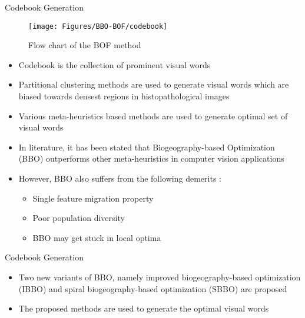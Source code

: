 \documentclass [9pt,times] {beamer}
\begin{document}
\begin{frame}{Codebook Generation}

\begin{figure}[t]
			\centering
			\texttt{[image: Figures/BBO-BOF/codebook]}
			\caption{{\scriptsize Flow chart of the BOF method}}\label{fig:emp}
		\end{figure}
\begin{itemize}
\justifying
\fontsize{7pt}{10pt}\selectfont
\item Codebook is the collection of prominent visual words
\item Partitional clustering methods are used to generate visual words which are biased towards densest regions in histopathological images
\item Various meta-heuristics based methods are used to generate optimal set of visual words
\item In literature, it has been stated that Biogeography-based Optimization (BBO) outperforms other meta-heuristics in computer vision applications \cite{ma2017}
\item However, BBO also suffers from the following demerits \cite{ma2011, lim2016}:\\[0.1cm]
\begin{itemize}
\scriptsize
\item Single feature migration property\\[0.2cm]
\item Poor population diversity\\[0.2cm]
\item BBO may get stuck in local optima\\[0.2cm]

\end{itemize}
\end{itemize}



\end{frame}

\begin{frame}{Codebook Generation}
\begin{itemize}

\item Two new variants of BBO, namely \textcolor[rgb]{0.00,0.00,1.00}{improved biogeography-based optimization} (IBBO) and \textcolor[rgb]{0.00,0.00,1.00}{spiral biogeography-based optimization} (SBBO) are proposed \\[3ex]
\item The proposed methods are used to generate the optimal visual words 

\end{itemize}


\end{frame}
\end{document}
